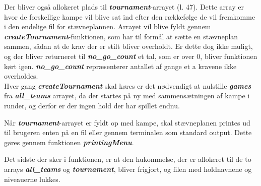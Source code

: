 \par
Der bliver også allokeret plads til \textbf{\textit{tournament}}-arrayet (l. 47). Dette array er hvor de forskellige kampe vil blive sat ind efter den rækkefølge de vil fremkomme i den endelige fil for stævneplannen. Arrayet vil blive fyldt gennem \textbf{\textit{createTournament}}-funktionen, som har til formål at sætte en stævneplan sammen, sådan at de krav der er stilt bliver overholdt. Er dette dog ikke muligt, og der bliver returneret til \textbf{\textit{no\_go\_count}} et tal, som er over 0, bliver funktionen kørt igen.
\textbf{\textit{no\_go\_count}} repræsenterer antallet af gange et a kravene ikke overholdes.
\\
Hver gang \textbf{\textit{createTournament}} skal køres er det nødvendigt at nulstille \textbf{\textit{games}} fra \textbf{\textit{all\_teams}} arrayet, da der startes på ny med sammensætningen af kampe i runder, og derfor er der ingen hold der har spillet endnu.
\par
Når \textbf{\textit{tournament}}-arrayet er fyldt op med kampe, skal stævneplanen printes ud til brugeren enten på en fil eller gennem terminalen som standard output. Dette gøres gennem funktionen \textbf{\textit{printingMenu}}.
\par
Det sidste der sker i funktionen, er at den hukommelse, der er allokeret til de to arrays \textbf{\textit{all\_teams}} og \textbf{\textit{tournament}}, bliver frigjort, og filen med holdnavnene og niveauerne lukkes.

